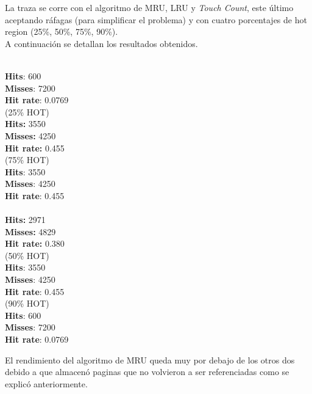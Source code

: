 \documentclass[11pt, a4paper, spanish]{article}
\begin{document}
La traza se corre con el algoritmo de MRU, LRU y \textit{Touch Count}, este \'ultimo aceptando r\'afagas (para simplificar el problema) y 
con cuatro porcentajes de hot region (25\%, 50\%, 75\%, 90\%).\\

\newpage
A continuaci\'on se detallan los resultados obtenidos.\\

\begin{multicols}{2}
\\
\textbf{Hits}: 600\\
\textbf{Misses}: 7200\\
\textbf{Hit rate}: 0.0769\\

 (25\% HOT)\\
\textbf{Hits:} 3550\\
\textbf{Misses:} 4250\\
\textbf{Hit rate:} 0.455\\

 (75\% HOT)\\
\textbf{Hits}: 3550\\
\textbf{Misses}: 4250\\
\textbf{Hit rate}: 0.455\\

\\
\textbf{Hits:} 2971\\
\textbf{Misses:} 4829\\
\textbf{Hit rate:} 0.380\\

 (50\% HOT)\\
\textbf{Hits}: 3550\\
\textbf{Misses}: 4250\\
\textbf{Hit rate}: 0.455\\

 (90\% HOT)\\
\textbf{Hits}: 600\\
\textbf{Misses}: 7200\\
\textbf{Hit rate}: 0.0769\\

\end{multicols}


El rendimiento del algoritmo de MRU queda muy por debajo de los otros dos debido a que almacen\'o paginas que no volvieron a ser referenciadas
 como se explic\'o anteriormente.\\
\end{document}
